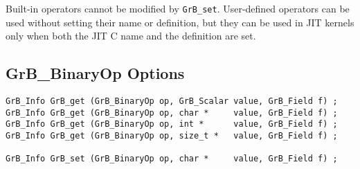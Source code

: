 Built-in operators cannot be modified by \verb'GrB_set'.  User-defined
operators can be used without setting their name or definition, but they can be
used in JIT kernels only when both the JIT C name and the definition are set.

\newpage
\subsection{{\sf GrB\_BinaryOp} Options}
\label{get_set_binop}

\begin{mdframed}[userdefinedwidth=6in]
{\footnotesize
\begin{verbatim}
GrB_Info GrB_get (GrB_BinaryOp op, GrB_Scalar value, GrB_Field f) ;
GrB_Info GrB_get (GrB_BinaryOp op, char *     value, GrB_Field f) ;
GrB_Info GrB_get (GrB_BinaryOp op, int *      value, GrB_Field f) ;
GrB_Info GrB_get (GrB_BinaryOp op, size_t *   value, GrB_Field f) ;

GrB_Info GrB_set (GrB_BinaryOp op, char *     value, GrB_Field f) ;
\end{verbatim}
}\end{mdframed}

